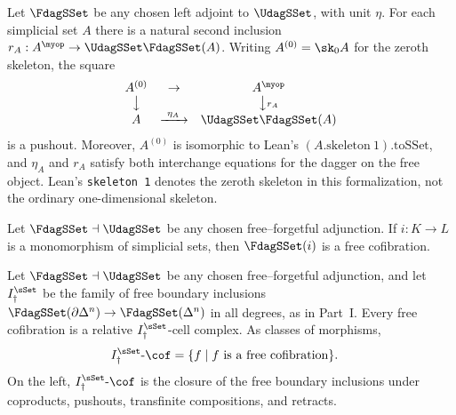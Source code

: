 \begin{resultblock}
\begin{theorem}
Let $\FdagSSet$ be any chosen left adjoint to $\UdagSSet$, with unit $\eta$.
For each simplicial set $A$ there is a natural second inclusion $r_A:A^{\myop}\to \UdagSSet\FdagSSet(A)$.
Writing $A^{(0)}=\sk_0A$ for the zeroth skeleton, the square
\begin{align}
  \begin{array}{ccc}
    A^{(0)}&\to&A^{\myop}\\
    \big\downarrow&&\big\downarrow\scriptstyle r_A\\
    A&\xrightarrow{\ \eta_A\ }&\UdagSSet\FdagSSet(A)
  \end{array}
\end{align}
is a pushout.
Moreover, $A^{(0)}$ is isomorphic to Lean's $(A.\mathrm{skeleton}\ 1).\mathrm{toSSet}$, and $\eta_A$ and $r_A$ satisfy both interchange equations for the dagger on the free object.
Lean's \texttt{skeleton 1} denotes the zeroth skeleton in this formalization, not the ordinary one-dimensional skeleton.
\end{theorem}
\end{resultblock}

\begin{resultblock}
\begin{proposition}
Let $\FdagSSet\dashv\UdagSSet$ be any chosen free--forgetful adjunction.
If $i:K\to L$ is a monomorphism of simplicial sets, then $\FdagSSet(i)$ is a free cofibration.
\end{proposition}
\end{resultblock}

\begin{resultblock}
\begin{theorem}
Let $\FdagSSet\dashv\UdagSSet$ be any chosen free--forgetful adjunction, and let $I^{\sSet}_{\dag}$ be the family of free boundary inclusions $\FdagSSet(\partial\Delta^n)\to\FdagSSet(\Delta^n)$ in all degrees, as in Part~I.
Every free cofibration is a relative $I^{\sSet}_{\dag}$-cell complex.
As classes of morphisms,
\begin{align}
  I^{\sSet}_{\dag}\text{-}\cof
    &= \{f\mid f\text{ is a free cofibration}\}.
\end{align}
On the left, $I^{\sSet}_{\dag}\text{-}\cof$ is the closure of the free boundary inclusions under coproducts, pushouts, transfinite compositions, and retracts.
\end{theorem}
\end{resultblock}

